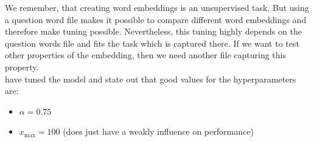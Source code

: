 We remember, that creating word embeddings is an unsupervised task. But using a
question word file makes it possible to compare different word embeddings and therefore make tuning possible. Nevertheless, this tuning highly depends on the 
question words file and fits the task which is captured there. If we want to 
test other properties of the embedding, then we need another file capturing 
this property.\\

\cite{pennington2014glove} have tuned the model and state out that good values for 
the hyperparameters are:
\begin{itemize}
  \item $\alpha = 0.75$
  \item $x_\mathrm{max} = 100$ (does just have a weakly influence on performance)
\end{itemize}

    


